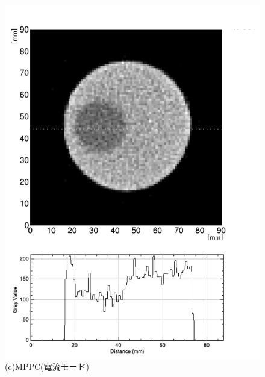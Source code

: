 \begin{figure}[H]
\begin{minipage}{0.5\hsize}
\begin{center}
     \includegraphics[bb=0.000000 0.000000 564.433340 778.975605,width=1.0\hsize]{image2/chapter5/low_contrast_MPPC_current_slice.png}
  \end{center}
  \vspace{-0.7cm}
   \caption*{(c)MPPC(電流モード)}
 \end{minipage}
 \begin{minipage}{0.5\hsize}
  \begin{center}

\end{center}
\end{minipage}
\end{figure}

